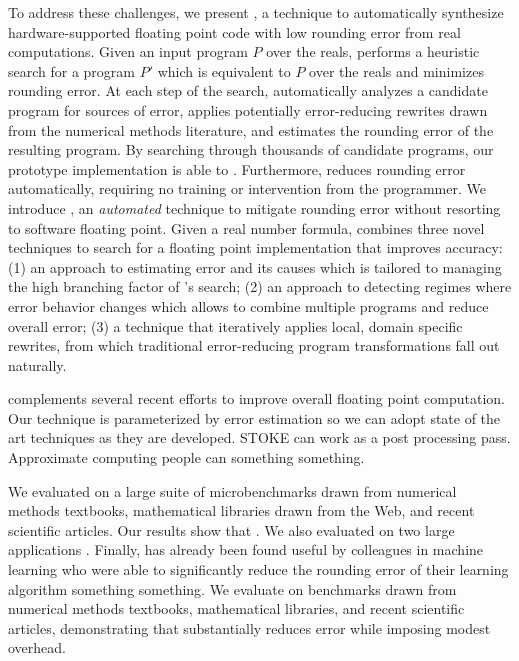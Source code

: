 \documentclass[paper.tex]{subfiles}
\begin{document}
To address these challenges, we present \casio, a technique to
automatically synthesize hardware-supported floating point code with
low rounding error  from real computations.  Given an
input program $P$ over the reals, \casio performs a heuristic search
for a program $P'$ which is equivalent to $P$ over the reals and
minimizes rounding error.  At each step of the search, \casio
automatically analyzes a candidate program for sources of error,
applies potentially error-reducing rewrites drawn from the numerical
methods literature, and estimates the rounding error of the resulting
program.  By searching through thousands of candidate programs, our
prototype implementation is able to .  Furthermore, \casio reduces rounding error
automatically, requiring no training or intervention from the
programmer.  We introduce \casio, an \textit{automated} technique to
mitigate rounding error without resorting to software floating point.
Given a real number formula, \casio combines three novel techniques to
search for a floating point implementation that improves accuracy: (1)
an approach to estimating error and its causes which is tailored to
managing the high branching factor of \casio's search; (2) an approach
to detecting regimes where error behavior changes which allows \casio
to combine multiple programs and reduce overall error; (3) a technique
that iteratively applies local, domain specific rewrites, from which
traditional error-reducing program transformations fall out naturally.

\casio complements several recent efforts to improve overall floating
point computation.  Our technique is parameterized by error estimation
so we can adopt state of the art techniques as they are developed.
STOKE can work as a post processing pass.  Approximate computing
people can something something.

We evaluated \casio on a large suite of microbenchmarks drawn from
numerical methods textbooks, mathematical libraries drawn from the
Web, and recent scientific articles.  Our results show that \casio
{}.  We also evaluated \casio on two large applications
.  Finally, \casio has already been found useful by
colleagues in machine learning who were able to significantly reduce
the rounding error of their learning algorithm something something.
We evaluate \casio on benchmarks drawn from numerical methods
textbooks, mathematical libraries, and recent scientific articles,
demonstrating that \casio substantially reduces error while imposing
modest overhead.
\end{document}
